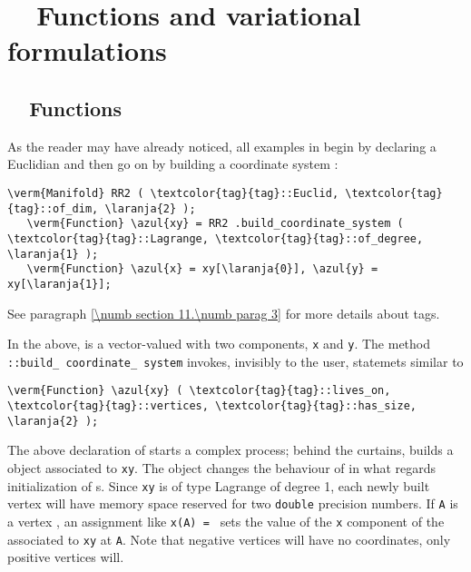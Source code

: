 
\chapter{~~Functions and variational formulations}\label{\numb section 5}


\section{~~Functions}\label{\numb section 5.\numb parag 1}

As the reader may have already noticed, all examples in {\maniFEM} begin by declaring a
Euclidian {\small\tt{}} and then go on by building a coordinate system :

\begin{Verbatim}[commandchars=\\\{\},formatcom=\small\tt,
   baselinestretch=0.94,framesep=2mm                     ]
   \verm{Manifold} RR2 ( \textcolor{tag}{tag}::Euclid, \textcolor{tag}{tag}::of_dim, \laranja{2} );
   \verm{Function} \azul{xy} = RR2 .build_coordinate_system ( \textcolor{tag}{tag}::Lagrange, \textcolor{tag}{tag}::of_degree, \laranja{1} );
   \verm{Function} \azul{x} = xy[\laranja{0}], \azul{y} = xy[\laranja{1}];
\end{Verbatim}

See paragraph \ref{\numb section 11.\numb parag 3} for more details about tags.

In the above, {\small\tt{}} is a vector-valued {\small\tt{}}
with two components, {\small\tt x} and {\small\tt y}.
The method {\small\tt{}::build\_\,coordinate\_\,system} invokes, invisibly to the user,
statemets similar to

\begin{Verbatim}[commandchars=\\\{\},formatcom=\small\tt,
   baselinestretch=0.94,framesep=2mm                     ]
   \verm{Function} \azul{xy} ( \textcolor{tag}{tag}::lives_on, \textcolor{tag}{tag}::vertices, \textcolor{tag}{tag}::has_size, \laranja{2} );
\end{Verbatim}

The above declaration of {\small\tt{}} starts a complex process; behind the curtains,
{\maniFEM} builds a {\small\tt{}} object associated to {\small\tt xy}.
The {\small\tt{}} object changes the behaviour of {\maniFEM} in what regards
initialization of {\small\tt{}}s.
Since {\small\tt xy} is of type Lagrange of degree 1, each newly built vertex
{\small\tt{}} will have memory space reserved for two {\small\tt double}
precision numbers.
If {\small\tt A} is a vertex {\small\tt{}}, an assignment like
{\small\tt x(A) = } sets the value of the {\small\tt x} component of the
{\small\tt{}} associated to {\small\tt xy} at {\small\tt A}.
Note that negative vertices will have no coordinates, only positive vertices will.

